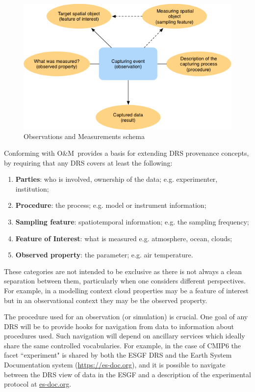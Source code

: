 \documentclass[final,1p,times,twocolumn,authoryear]{elsarticle}
\newcommand{\om}{O\&M}
\begin{document}
\begin{figure} \label{fig:oandm}
\centering
\includegraphics[]{images/basic_om_model.png}
\caption{Observations and Measurements schema}
\end{figure}

Conforming with \om\ provides a basis for extending DRS provenance concepts, by requiring that any DRS covers at least the following:
\begin{enumerate}
\item \textbf{Parties}: who is involved, ownership of the data; e.g. experimenter, institution;
\item \textbf{Procedure}: the process; e.g. model or instrument information;
\item \textbf{Sampling feature}: spatiotemporal information; e.g. the sampling frequency;
\item \textbf{Feature of Interest}:  what is measured e.g. atmosphere, ocean, clouds;
\item \textbf{Observed property}: the parameter; e.g. air temperature.
\end{enumerate}

These categories are not intended to be exclusive as there is not always a clean separation between them, particularly when one considers different perspectives.
For example, in a modelling context cloud properties may be a feature of interest but in an observational context they may be the observed property.

The procedure used for an observation (or simulation) is crucial. 
One goal of any DRS will be to provide hooks for navigation from data to information about procedures used.
Such navigation will depend on ancillary services which ideally share the same controlled vocabularies.
For example, in the case of CMIP6 the facet ``experiment" is shared by both the ESGF DRS and the Earth System Documentation system (\href{https://es-doc.org}{https://es-doc.org}), and it is possible to navigate between the DRS view of data in the ESGF and a description of the experimental protocol \citep{PasEA19} at \href{https://search.es-doc.org/?project=cmip6&documentType=cim.2.designing.NumericalExperiment&client=esdoc-url-rewrite}{es-doc.org}.
\end{document}
